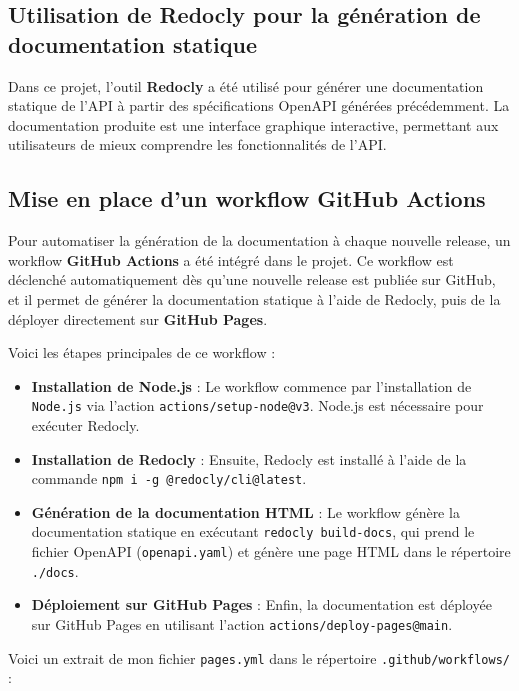 \documentclass{article}
\begin{document}
	\subsection{Utilisation de Redocly pour la génération de documentation statique}
	\label{subsec:redocly}
	
	Dans ce projet, l'outil \textbf{Redocly} a été utilisé pour générer une documentation statique de l'API à partir des spécifications OpenAPI générées précédemment. La documentation produite est une interface graphique interactive, permettant aux utilisateurs de mieux comprendre les fonctionnalités de l'API.
	
	\subsection{Mise en place d'un workflow GitHub Actions}
	
	Pour automatiser la génération de la documentation à chaque nouvelle release, un workflow \textbf{GitHub Actions} a été intégré dans le projet. Ce workflow est déclenché automatiquement dès qu'une nouvelle release est publiée sur GitHub, et il permet de générer la documentation statique à l'aide de Redocly, puis de la déployer directement sur \textbf{GitHub Pages}.
	
	Voici les étapes principales de ce workflow :
	\begin{itemize}
		\item \textbf{Installation de Node.js} : Le workflow commence par l'installation de \texttt{Node.js} via l'action \texttt{actions/setup-node@v3}. Node.js est nécessaire pour exécuter Redocly.
		\item \textbf{Installation de Redocly} : Ensuite, Redocly est installé à l'aide de la commande \texttt{npm i -g @redocly/cli@latest}.
		\item \textbf{Génération de la documentation HTML} : Le workflow génère la documentation statique en exécutant \texttt{redocly build-docs}, qui prend le fichier OpenAPI (\texttt{openapi.yaml}) et génère une page HTML dans le répertoire \texttt{./docs}.
		\item \textbf{Déploiement sur GitHub Pages} : Enfin, la documentation est déployée sur GitHub Pages en utilisant l'action \texttt{actions/deploy-pages@main}.
	\end{itemize}
	
	Voici un extrait de mon fichier \texttt{pages.yml} dans le répertoire \texttt{.github/workflows/} :
	
\end{document}
